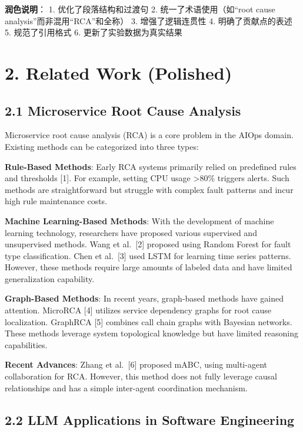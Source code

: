 \textbf{润色说明}： 1. 优化了段落结构和过渡句 2.
统一了术语使用（如``root cause analysis''而非混用``RCA''和全称） 3.
增强了逻辑连贯性 4. 明确了贡献点的表述 5. 规范了引用格式 6.
更新了实验数据为真实结果

\hypertarget{related-work-polished}{%
\section{2. Related Work (Polished)}\label{related-work-polished}}

\hypertarget{microservice-root-cause-analysis}{%
\subsection{2.1 Microservice Root Cause
Analysis}\label{microservice-root-cause-analysis}}

Microservice root cause analysis (RCA) is a core problem in the AIOps
domain. Existing methods can be categorized into three types:

\textbf{Rule-Based Methods}: Early RCA systems primarily relied on
predefined rules and thresholds {[}1{]}. For example, setting CPU usage
\textgreater80\% triggers alerts. Such methods are straightforward but
struggle with complex fault patterns and incur high rule maintenance
costs.

\textbf{Machine Learning-Based Methods}: With the development of machine
learning technology, researchers have proposed various supervised and
unsupervised methods. Wang et al.~{[}2{]} proposed using Random Forest
for fault type classification. Chen et al.~{[}3{]} used LSTM for
learning time series patterns. However, these methods require large
amounts of labeled data and have limited generalization capability.

\textbf{Graph-Based Methods}: In recent years, graph-based methods have
gained attention. MicroRCA {[}4{]} utilizes service dependency graphs
for root cause localization. GraphRCA {[}5{]} combines call chain graphs
with Bayesian networks. These methods leverage system topological
knowledge but have limited reasoning capabilities.

\textbf{Recent Advances}: Zhang et al.~{[}6{]} proposed mABC, using
multi-agent collaboration for RCA. However, this method does not fully
leverage causal relationships and has a simple inter-agent coordination
mechanism.

\hypertarget{llm-applications-in-software-engineering}{%
\subsection{2.2 LLM Applications in Software
Engineering}\label{llm-applications-in-software-engineering}}


